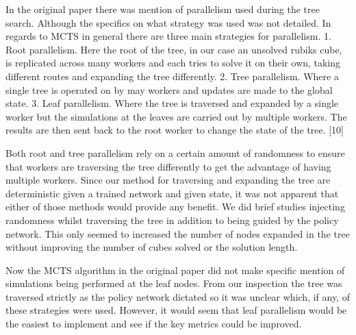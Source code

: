 \documentclass[10pt,twocolumn,letterpaper]{article}
\begin{document}
In the original paper there was mention of parallelism used during the tree search.  Although the specifics on what strategy was used was not detailed.  In regards to MCTS in general there are three main strategies for parallelism. 1. Root parallelism. Here the root of the tree, in our case an unsolved rubiks cube, is replicated across many workers and each tries to solve it on their own, taking different routes and expanding the tree differently.  2. Tree parallelism.  Where a single tree is operated on by may workers and updates are made to the global state. 3. Leaf parallelism.  Where the tree is traversed and expanded by a single worker but the simulations at the leaves are carried out by multiple workers.  The results are then sent back to the root worker to change the state of the tree. [10]

Both root and tree parallelism rely on a certain amount of randomness to ensure that workers are traversing the tree differently to get the advantage of having multiple workers.  Since our method for traversing and expanding the tree are deterministic given a trained network and given state, it was not apparent that either of those methods would provide any benefit.  We did brief studies injecting randomness whilst traversing the tree in addition to being guided by the policy network.  This only seemed to increased the number of nodes expanded in the tree without improving the number of cubes solved or the solution length. 

Now the MCTS algorithm in the original paper did not make specific mention of simulations being performed at the leaf nodes.  From our inspection the tree was traversed strictly as the policy network dictated so it was unclear which, if any, of these strategies were used.  However, it would seem that leaf parallelism would be the easiest to implement and see if the key metrics could be improved. 
\end{document}
